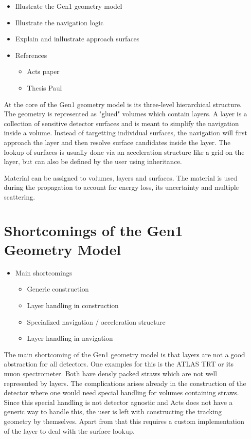 \begin{itemize}
    \color{red}
    \item Illustrate the Gen1 geometry model
    \item Illustrate the navigation logic
    \item Explain and inllustrate approach surfaces
    \item References
    \begin{itemize}
        \item Acts paper
        \item Thesis Paul
    \end{itemize}
\end{itemize}

At the core of the Gen1 geometry model is its three-level hierarchical structure. The geometry is represented as "glued" volumes which contain layers. A layer is a collection of sensitive detector surfaces and is meant to simplify the navigation inside a volume. Instead of targetting individual surfaces, the navigation will first approach the layer and then resolve surface candidates inside the layer. The lookup of surfaces is usually done via an acceleration structure like a grid on the layer, but can also be defined by the user using inheritance.

Material can be assigned to volumes, layers and surfaces. The material is used during the propagation to account for energy loss, its uncertainty and multiple scattering.

\section{Shortcomings of the Gen1 Geometry Model}

\begin{itemize}
    \color{red}
    \item Main shortcomings
    \begin{itemize}
        \item Generic construction
        \item Layer handling in construction
        \item Specialized navigation / acceleration structure
        \item Layer handling in navigation
    \end{itemize}
\end{itemize}

The main shortcoming of the Gen1 geometry model is that layers are not a good abstraction for all detectors. One examples for this is the ATLAS TRT or its muon spectrometer. Both have densly packed straws which are not well represented by layers. The complications arises already in the construction of the detector where one would need special handling for volumes containing straws. Since this special handling is not detector agnostic and Acts does not have a generic way to handle this, the user is left with constructing the tracking geometry by themselves. Apart from that this requires a custom implementation of the layer to deal with the surface lookup.

